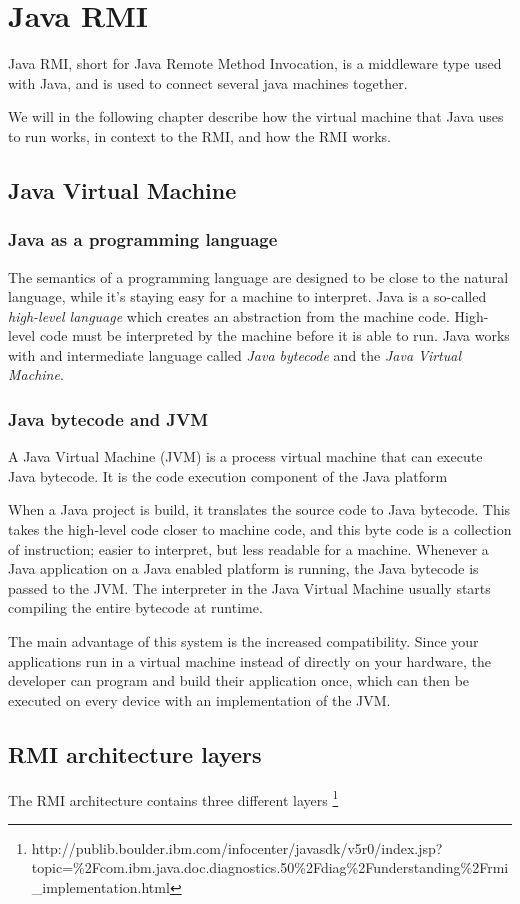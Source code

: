 \section{Java RMI}
Java RMI, short for Java Remote Method Invocation, is a middleware type used with Java, and is used to connect several java machines together.

We will in the following chapter describe how the virtual machine that Java uses to run works, in context to the RMI, and how the RMI works.
\subsection{Java Virtual Machine}
\subsubsection{Java as a programming language}
The semantics of a programming language are designed to be close to the natural language, while it's staying easy for a machine to interpret. Java is a so-called \emph{high-level language} which creates an abstraction from the machine code. High-level code must be interpreted by the machine before it is able to run. Java works with and intermediate language called \emph{Java bytecode} and the \emph{Java Virtual Machine}.

\subsubsection{Java bytecode and JVM}
A Java Virtual Machine (JVM) is a process virtual machine that can execute Java bytecode. It is the code execution component of the Java platform

When a Java project is build, it translates the source code to Java bytecode. This takes the high-level code closer to machine code, and this byte code is a collection of instruction; easier to interpret, but less readable for a machine. Whenever a Java application on a Java enabled platform is running, the Java bytecode is passed to the JVM. The interpreter in the Java Virtual Machine usually starts compiling the entire bytecode at runtime.

The main advantage of this system is the increased compatibility. Since your applications run in a virtual machine instead of directly on your hardware, the developer can program and build their application once, which can then be executed on every device with an implementation of the JVM.

\subsection{RMI architecture layers}
The RMI architecture contains three different layers \footnote{http://publib.boulder.ibm.com/infocenter/javasdk/v5r0/index.jsp?\\topic=\%2Fcom.ibm.java.doc.diagnostics.50\%2Fdiag\%2Funderstanding\%2Frmi\_implementation.html}

